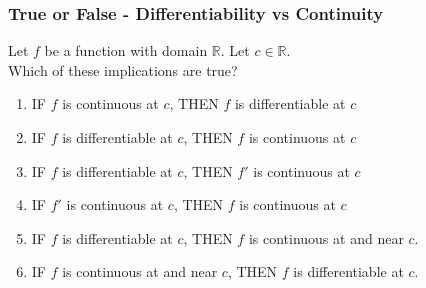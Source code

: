 \documentclass[14pt]{beamer}
\begin{document}

	\begin{frame}[t]
		\fontsize{13}{13}\selectfont
		\frametitle{True or False - Differentiability vs Continuity}

		Let $f$ be a function with domain $\mathbb{R}$. Let $c \in \mathbb{R}$. \\ Which
		of these implications are true?

		\vfill

		\begin{enumerate}
			\item IF $f$ is {\color{red} continuous} at $c$, THEN $f$ is
				{\color{blue} differentiable} at $c$
				\vfill

			\item IF $f$ is {\color{blue} differentiable} at $c$, THEN $f$ is
				{\color{red} continuous} at $c$
				\vfill

			\item IF $f$ is {\color{blue} differentiable} at $c$, THEN $f'$ is
				{\color{red} continuous} at $c$
				\vfill

			\item IF $f'$ is {\color{red} continuous} at $c$, THEN $f$ is
				{\color{red} continuous} at $c$
				\vfill

			\item IF $f$ is {\color{blue} differentiable} at $c$, THEN $f$ is
				{\color{red} continuous} at and near $c$.
				\vfill

			\item IF $f$ is {\color{red} continuous} at and near $c$, THEN $f$ is
				{\color{blue} differentiable} at $c$.
				\vfill
		\end{enumerate}
	\end{frame}
\end{document}
